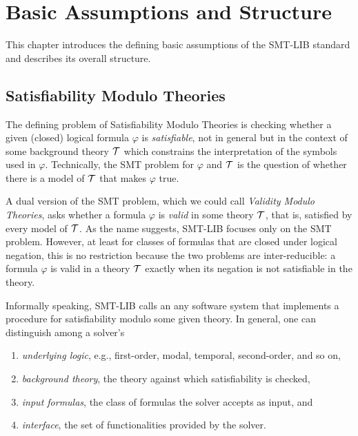 


\chapter{Basic Assumptions and Structure} 
\thispagestyle{empty}


This chapter introduces the defining basic assumptions 
of the SMT-LIB standard and 
describes its overall structure.


\bigskip

\section{Satisfiability Modulo Theories}

The defining problem of Satisfiability Modulo Theories is checking 
whether a given (closed) logical formula $\varphi$ is \emph{satisfiable},
not in general but in the context of some background theory $\mathcal{T}$
which constrains the interpretation of the symbols used in $\varphi$.
Technically, the SMT problem for $\varphi$ and $\mathcal{T}$ is 
the question of 
whether there is a model of $\mathcal{T}$ that makes $\varphi$ true.
 
A dual version of the SMT problem, 
which we could call \emph{Validity Modulo Theories},
asks whether a formula $\varphi$ is \emph{valid} in some theory $\mathcal{T}$,
that is, satisfied by every model of $\mathcal{T}$.
As the name suggests, SMT-LIB focuses only on the SMT problem.
However, at least for classes of formulas that are closed under logical negation,
this is no restriction because the two problems are inter-reducible:
a formula $\varphi$ is valid in a theory $\mathcal{T}$ exactly when 
its negation is not satisfiable in the theory.

Informally speaking, SMT-LIB calls an 
any software system that implements 
a procedure for satisfiability modulo some given theory.
In general,
one can distinguish among a solver's 
\begin{enumerate}
\item
\emph{underlying logic},
e.g., first-order, modal, temporal, second-order, and so on,

\item
\emph{background theory},
the theory against which satisfiability is checked,

\item
\emph{input formulas}, 
the class of formulas the solver accepts as input,
and

\item
\emph{interface}, 
the set of functionalities provided by the solver.
\end{enumerate}

